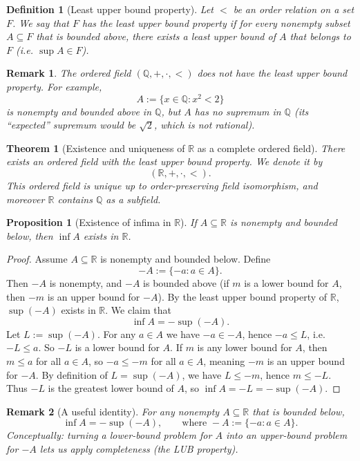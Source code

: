 \documentclass[12pt]{article}
\newtheorem*{remark}{Remark}
\newtheorem{theorem}{Theorem}
\newtheorem{proposition}{Proposition}
\newtheorem{definition}{Definition}
\begin{document}
\begin{definition}[Least upper bound property]
Let $<$ be an order relation on a set $F$. We say that $F$ has the \emph{least upper bound property} if for every nonempty subset
$A\subseteq F$ that is bounded above, there exists a least upper bound of $A$ that belongs to $F$ (i.e. $\sup A\in F$).
\end{definition}

\begin{remark}
The ordered field $(\mathbb{Q},+,\cdot,<)$ does \emph{not} have the least upper bound property. For example,
\[A:=\{x\in\mathbb{Q}: x^2<2\}\]
is nonempty and bounded above in $\mathbb{Q}$, but $A$ has no supremum in $\mathbb{Q}$ (its “expected” supremum would be $\sqrt{2}$,
which is not rational).
\end{remark}

\begin{theorem}[Existence and uniqueness of $\mathbb{R}$ as a complete ordered field]
There exists an ordered field with the least upper bound property. We denote it by
\[(\mathbb{R},+,\cdot,<).
\]
This ordered field is unique up to order-preserving field isomorphism, and moreover $\mathbb{R}$ contains $\mathbb{Q}$ as a subfield.
\end{theorem}

\begin{proposition}[Existence of infima in $\mathbb{R}$]
If $A\subseteq\mathbb{R}$ is nonempty and bounded below, then $\inf A$ exists in $\mathbb{R}$.
\end{proposition}

\begin{proof}
Assume $A\subseteq\mathbb{R}$ is nonempty and bounded below. Define
\[-A:=\{-a: a\in A\}.
\]
Then $-A$ is nonempty, and $-A$ is bounded above (if $m$ is a lower bound for $A$, then $-m$ is an upper bound for $-A$).
By the least upper bound property of $\mathbb{R}$, $\sup(-A)$ exists in $\mathbb{R}$. We claim that
\[\inf A=-\sup(-A).
\]
Let $L:=\sup(-A)$. For any $a\in A$ we have $-a\in -A$, hence $-a\le L$, i.e. $-L\le a$. So $-L$ is a lower bound for $A$.
If $m$ is any lower bound for $A$, then $m\le a$ for all $a\in A$, so $-a\le -m$ for all $a\in A$, meaning $-m$ is an upper bound for $-A$.
By definition of $L=\sup(-A)$, we have $L\le -m$, hence $m\le -L$.
Thus $-L$ is the greatest lower bound of $A$, so $\inf A=-L=-\sup(-A)$.
\end{proof}

\begin{remark}[A useful identity]
For any nonempty $A\subseteq\mathbb{R}$ that is bounded below,
\[\inf A=-\sup(-A),\qquad \text{where } -A:=\{-a:a\in A\}.
\]
Conceptually: turning a lower-bound problem for $A$ into an upper-bound problem for $-A$ lets us apply completeness (the LUB property).
\end{remark}
\end{document}
